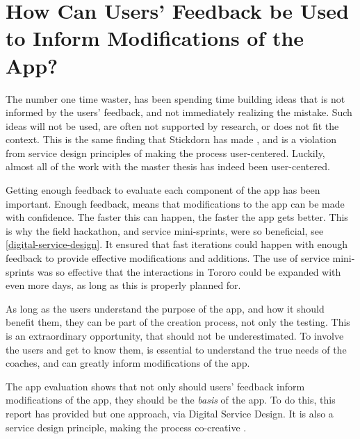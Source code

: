 
\section{How Can Users' Feedback be Used to Inform Modifications of the App?}


  The number one time waster, has been spending time building ideas that is not informed by the users' feedback, and not immediately realizing the mistake. Such ideas will not be used, are often not supported by research, or does not fit the context. This is the same finding that Stickdorn has made \cite{stickdorn}, and is a violation from service design principles of making the process user-centered. Luckily, almost all of the work with the master thesis has indeed been user-centered.

  Getting enough feedback to evaluate each component of the app has been important. Enough feedback, means that modifications to the app can be made with confidence. The faster this can happen, the faster the app gets better. This is why the field hackathon, and service mini-sprints, were so beneficial, see \ref{digital-service-design}. It ensured that fast iterations could happen with enough feedback to provide effective modifications and additions. The use of service mini-sprints was so effective that the interactions in Tororo could be expanded with even more days, as long as this is properly planned for.

  As long as the users understand the purpose of the app, and how it should benefit them, they can be part of the creation process, not only the testing. This is an extraordinary opportunity, that should not be underestimated. To involve the users and get to know them, is essential to understand the true needs of the coaches, and can greatly inform modifications of the app.

  The app evaluation shows that not only should users' feedback inform modifications of the app, they should be the \textit{basis} of the app. To do this, this report has provided but one approach, via Digital Service Design. It is also a service design principle, making the process co-creative \cite{stickdorn}.

